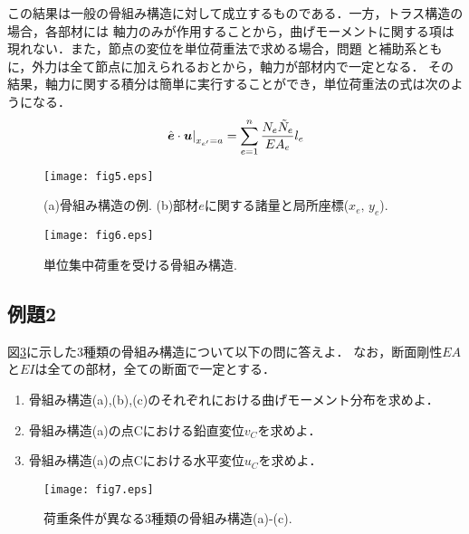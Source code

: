 \documentclass[10pt,a4j]{jarticle}
\begin{document}
この結果は一般の骨組み構造に対して成立するものである．一方，トラス構造の場合，各部材には
軸力のみが作用することから，曲げモーメントに関する項は現れない．また，節点の変位を単位荷重法で求める場合，問題
と補助系ともに，外力は全て節点に加えられるおとから，軸力が部材内で一定となる．
その結果，軸力に関する積分は簡単に実行することができ，単位荷重法の式は次のようになる．
\begin{equation}
	\left.
	\hat{\mbox{\boldmath $e$}}\cdot \mbox{\boldmath $u$}
	\right|_{x_{e'}=a}
	=
	\sum_{e=1}^n 
	\frac{N_e \tilde N_e}{EA_e}l_e
\end{equation}
\begin{figure}[h]
	\begin{center}
	\texttt{[image: fig5.eps]} 
	\end{center}
	\caption{(a)骨組み構造の例. 
	 (b)部材$e$に関する諸量と局所座標($x_e,\,y_e$).} 
	\label{fig:fig5}
\end{figure}
\begin{figure}
	\begin{center}
	\texttt{[image: fig6.eps]} 
	\end{center}
	\caption{単位集中荷重を受ける骨組み構造.} 
	\label{fig:fig6}
\end{figure}
\subsection{例題2}
図\ref{fig:fig7}に示した3種類の骨組み構造について以下の問に答えよ．
なお，断面剛性$EA$と$EI$は全ての部材，全ての断面で一定とする．
\begin{enumerate}
\item
	骨組み構造(a),(b),(c)のそれぞれにおける曲げモーメント分布を求めよ．
\item
	骨組み構造(a)の点Cにおける鉛直変位$v_C$を求めよ．
\item
	骨組み構造(a)の点Cにおける水平変位$u_C$を求めよ．
\end{enumerate}
\begin{figure}
	\begin{center}
	\texttt{[image: fig7.eps]} 
	\end{center}
	\caption{荷重条件が異なる3種類の骨組み構造(a)-(c).}
	\label{fig:fig7}
\end{figure}
\end{document}
